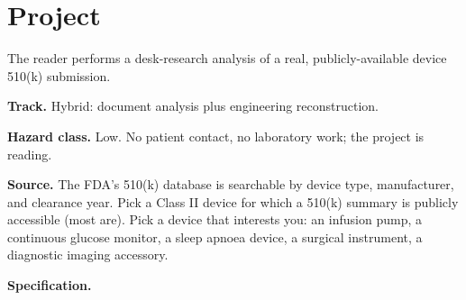\section{Project}

\begin{project}
The reader performs a desk-research analysis of a real,
publicly-available device 510(k) submission.

\textbf{Track.} Hybrid: document analysis plus engineering
reconstruction.

\textbf{Hazard class.} Low. No patient contact, no laboratory
work; the project is reading.

\textbf{Source.} The FDA's 510(k) database
\cite{web:v6c12-fda-510k-database-2024} is searchable by device
type, manufacturer, and clearance year. Pick a Class II device for
which a 510(k) summary is publicly accessible (most are). Pick a
device that interests you: an infusion pump, a continuous
glucose monitor, a sleep apnoea device, a surgical instrument,
a diagnostic imaging accessory.

\textbf{Specification.}


\end{project}
